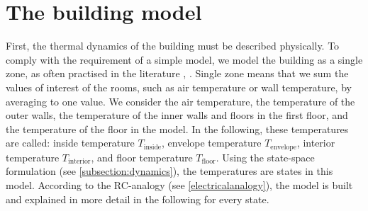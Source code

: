    \section{The building model}
    \label{sec:building model}
    First, the thermal dynamics of the building must be described physically. To comply with the requirement of a simple model, we model the building as a single zone, as often practised in the literature \cite{Park.2011}, \cite{Hazyuk.2012}. Single zone means that we sum the values of interest of the rooms, such as air temperature or wall temperature, by averaging to one value. 
    \newline
    We consider the air temperature, the temperature of the outer walls, the temperature of the inner walls and floors in the first floor, and the temperature of the floor in the model. In the following, these temperatures are called: inside temperature  $T_\text{inside}$, envelope temperature $T_\text{envelope}$, interior temperature $T_\text{interior}$, and floor temperature $T_\text{floor}$. 
    Using the state-space formulation (see \autoref{subsection:dynamics}), the temperatures are states in this model. According to the RC-analogy (see \autoref{electricalanalogy}), the model is built and explained in more detail in the following for every state. \newline
    
